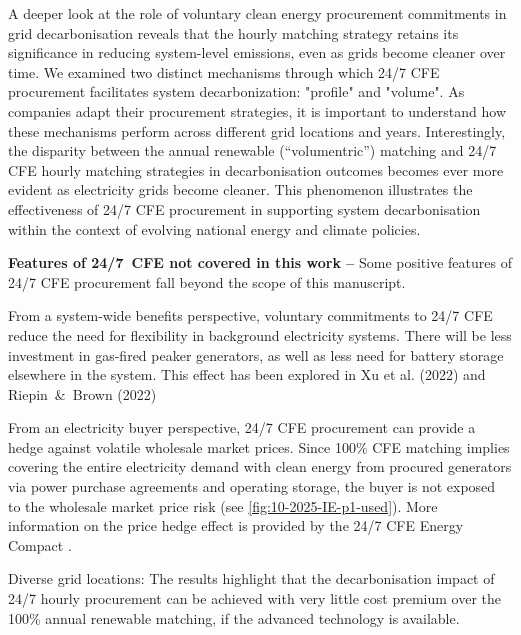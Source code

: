 A deeper look at the role of voluntary clean energy procurement commitments in grid decarbonisation reveals that the hourly matching strategy retains its significance in reducing system-level emissions, even as grids become cleaner over time.
We examined two distinct mechanisms through which 24/7 CFE procurement facilitates system decarbonization: "profile" and "volume".
As companies adapt their procurement strategies, it is important to understand how these mechanisms perform across different grid locations and years.
Interestingly, the disparity between the annual renewable (\enquote{volumentric}) matching and 24/7 CFE hourly matching strategies in decarbonisation outcomes becomes ever more evident as electricity grids become cleaner.
This phenomenon illustrates the effectiveness of 24/7 CFE procurement in supporting system decarbonisation within the context of evolving national energy and climate policies.


\textbf{Features of 24/7~CFE not covered in this work --} Some positive features of 24/7 CFE procurement fall beyond the scope of this manuscript.

From a system-wide benefits perspective, voluntary commitments to 24/7 CFE reduce the need for flexibility in background electricity systems. 
There will be less investment in gas-fired peaker generators, as well as less need for battery storage elsewhere in the system.
This effect has been explored in Xu et al. (2022) and Riepin~\&~Brown (2022) \cite{riepin-zenodo-systemlevel247,xu-247CFE-report}

From an electricity buyer perspective, 24/7 CFE procurement can provide a hedge against volatile wholesale market prices.
Since 100\% CFE matching implies covering the entire electricity demand with clean energy from procured generators via power purchase agreements and operating storage, the buyer is not exposed to the wholesale market price risk (see \cref{fig:10-2025-IE-p1-used}).
More information on the price hedge effect is provided by the 24/7 CFE Energy Compact \cite{gocarbonfree247}.


Diverse grid locations:
The results highlight that the decarbonisation impact of 24/7 hourly procurement can be achieved with very little cost premium over the 100\% annual renewable matching, if the advanced technology is available.
